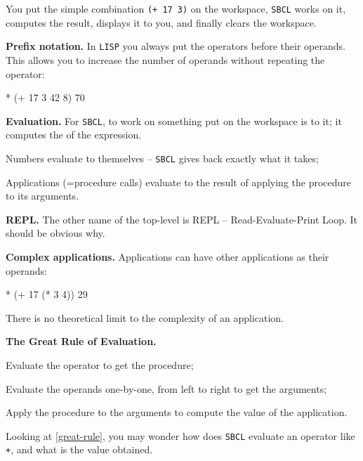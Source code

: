 \documentclass[a4paper,11pt]{article}
\begin{document}
\begin{uenum}
You put the simple combination \Verb-(+ 17 3)- on the workspace, \Verb+SBCL+ works on it, computes the result, displays it to you, and finally clears the workspace.

\item {\bf Prefix notation.} In \Verb+LISP+ you always put the operators before their operands. This allows you to increase the number of operands without repeating the operator:

\begin{lispcode}
* (+ 17 3 42 8)
70
\end{lispcode}

\item {\bf Evaluation.} For \Verb+SBCL+, to work on something put on the workspace is to  it; it computes the  of the expression.

\begin{uenumi}
\item Numbers evaluate to themselves -- \Verb+SBCL+ gives back exactly what it takes;
\item Applications (=procedure calls) evaluate to the result of applying the procedure to its arguments.
\end{uenumi}

\item {\bf REPL.} The other name of the top-level is REPL -- Read-Evaluate-Print Loop. It should be obvious why.

\item {\bf Complex applications.} Applications can have other applications as their operands:
\label{complex-app}
\begin{lispcode}
* (+ 17 (* 3 4))
29
\end{lispcode}

There is no theoretical limit to the complexity of an application.

\item {\bf The Great Rule of Evaluation.}
\label{great-rule}
\begin{uenumi}
\item Evaluate the operator to get the procedure;
\item Evaluate the operands one-by-one, from left to right to get the arguments;
\item Apply the procedure to the arguments to compute the value of the application.
\end{uenumi}

\item Looking at \ref{great-rule}, you may wonder how does \Verb+SBCL+ evaluate an operator like \Verb-+-, and what is the value obtained.


\end{uenum}
\end{document}
